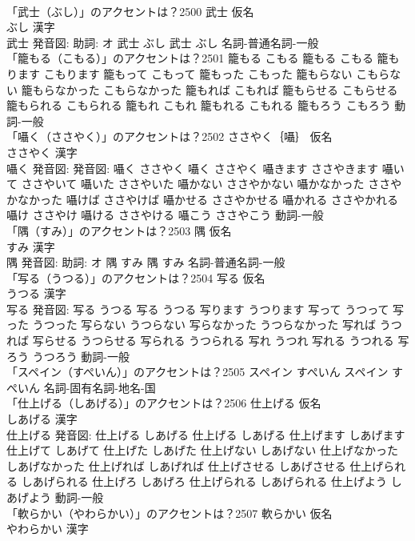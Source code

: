 \documentclass[8pt]{extreport}
\begin{document}
\begin{CJK}{UTF8}{min}
\\	「武士（ぶし）」のアクセントは？2500	武士 仮名　
\\	ぶし 漢字　
\\	武士 発音図: 助詞: オ	武士 ぶし		武士 ぶし				名詞-普通名詞-一般 
\\	「籠もる（こもる）」のアクセントは？2501		籠もる こもる		籠もる こもる 籠もります こもります 籠もって こもって 籠もった こもった 籠もらない こもらない 籠もらなかった こもらなかった 籠もれば こもれば 籠もらせる こもらせる 籠もられる こもられる 籠もれ こもれ 籠もれる こもれる 籠もろう こもろう				動詞-一般 
\\	「囁く（ささやく）」のアクセントは？2502	ささやく｛囁｝ 仮名　
\\	ささやく 漢字　
\\	囁く 発音図: 発音図:	囁く ささやく		囁く ささやく 囁きます ささやきます 囁いて ささやいて 囁いた ささやいた 囁かない ささやかない 囁かなかった ささやかなかった 囁けば ささやけば 囁かせる ささやかせる 囁かれる ささやかれる 囁け ささやけ 囁ける ささやける 囁こう ささやこう				動詞-一般 
\\	「隅（すみ）」のアクセントは？2503	隅 仮名　
\\	すみ 漢字　
\\	隅 発音図: 助詞: オ	隅 すみ		隅 すみ				名詞-普通名詞-一般 
\\	「写る（うつる）」のアクセントは？2504	写る 仮名　
\\	うつる 漢字　
\\	写る 発音図:	写る うつる		写る うつる 写ります うつります 写って うつって 写った うつった 写らない うつらない 写らなかった うつらなかった 写れば うつれば 写らせる うつらせる 写られる うつられる 写れ うつれ 写れる うつれる 写ろう うつろう				動詞-一般 
\\	「スペイン（すぺいん）」のアクセントは？2505		スペイン すぺいん		スペイン すぺいん				名詞-固有名詞-地名-国 
\\	「仕上げる（しあげる）」のアクセントは？2506	仕上げる 仮名　
\\	しあげる 漢字　
\\	仕上げる 発音図:	仕上げる しあげる		仕上げる しあげる 仕上げます しあげます 仕上げて しあげて 仕上げた しあげた 仕上げない しあげない 仕上げなかった しあげなかった 仕上げれば しあげれば 仕上げさせる しあげさせる 仕上げられる しあげられる 仕上げろ しあげろ 仕上げられる しあげられる 仕上げよう しあげよう				動詞-一般 
\\	「軟らかい（やわらかい）」のアクセントは？2507	軟らかい 仮名　
\\	やわらかい 漢字　

\end{CJK}
\end{document}
